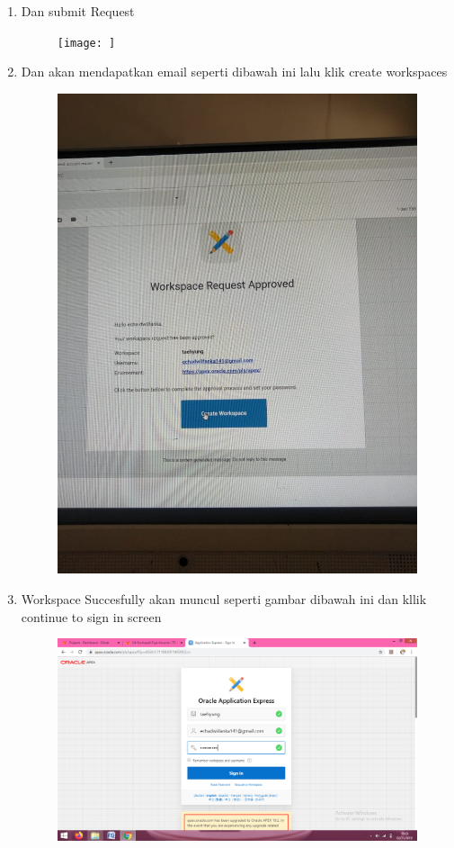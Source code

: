 \begin{enumerate}
	\item Dan submit Request
	\begin{figure} [!htbp]
	\texttt{[image: ]}
	\centering
	\end{figure}
	
	\item Dan akan mendapatkan email seperti dibawah ini lalu klik create workspaces 
	\begin{figure} [!htbp]
	\includegraphics[scale=0.2]{section/gambar/5.jpeg}
	\centering
	\end{figure}
	
	\item Workspace Succesfully akan muncul seperti gambar dibawah ini dan kllik continue to sign in screen
	\begin{figure} [!htbp]
	\includegraphics[scale=0.2]{section/gambar/b.png}
	\centering
	\end{figure}
	

\end{enumerate}

